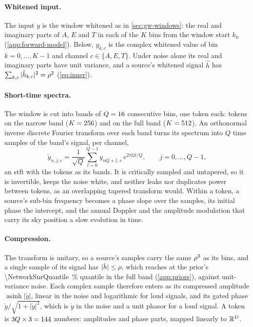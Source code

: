 \paragraph{Whitened input.}
The input $y$ is the window whitened as in \cref{sec:gw-windows}: the real and imaginary parts of
$A$, $E$ and $T$ in each of the $K$ bins from the window start $k_0$ (\cref{app:forward-model}).
Below, $y_{k,c}$ is the complex whitened value of bin $k = 0,\dots,K-1$ and channel $c\in\{A, E,
T\}$. Under noise alone its real and imaginary parts have unit variance, and a source's whitened
signal $\hat h$ has $\sum_{k,c}|\hat h_{k,c}|^2 = \rho^2$ (\cref{eq:inner}).

\paragraph{Short-time spectra.}
The window is cut into bands of $Q=16{}$ consecutive bins, one token each:
\NetworkTokensNarrow{} tokens on the narrow band ($K=256{}$) and
\NetworkTokensFull{} on the full band ($K=512{}$). An orthonormal inverse discrete
Fourier transform over each band turns its spectrum into $Q$ time samples of the band's signal, per
channel,
\begin{equation}
  \check y_{n,j,c} = \frac{1}{\sqrt Q}\sum_{l=0}^{Q-1} y_{nQ+l,\,c}\,e^{2\pi\ii jl/Q},
  \qquad j = 0,\dots,Q-1,
  \label{eq:network-stft}
\end{equation}
an \ac{stft} with the tokens as its bands. It is critically sampled and untapered, so it is
invertible, keeps the noise white, and neither leaks nor duplicates power between tokens, as an
overlapping tapered transform would. Within a token, a source's sub-bin frequency becomes a phase
slope over the samples, its initial phase the intercept, and the annual Doppler and the amplitude
modulation that carry its sky position a slow evolution in time.

\paragraph{Compression.}
The transform is unitary, so a source's samples carry the same $\rho^2$ as its bins, and a single
sample of its signal has $|\check h| \le \rho$, which reaches \NetworkSnrTop{} at the prior's
\qty{\NetworkSnrQuantile}{\percent} quantile in the full band (\cref{app:priors}), against
unit-variance noise. Each complex sample therefore enters as its compressed amplitude
$\operatorname{asinh}|\check y|$, linear in the noise and logarithmic for loud signals, and its
gated phase $\check y/\sqrt{1+|\check y|^2}$, which is $\check y$ in the noise and a unit phasor
for a loud signal. A token is $3Q\times3 = 144{}$ numbers:
\NetworkAmplitudeScalars{} amplitudes and \NetworkPhaseScalars{} phase parts, mapped linearly to
$\mathbb{R}^D$.

